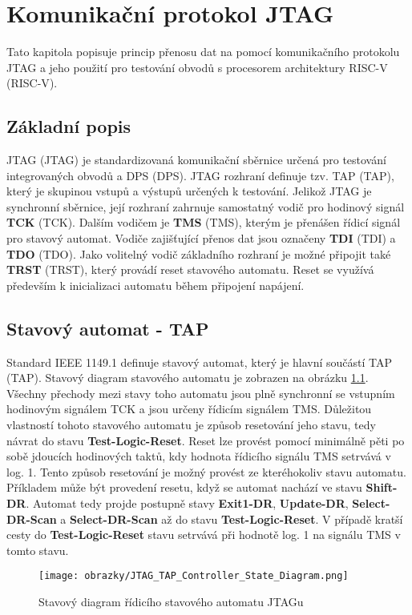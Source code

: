 \chapter{Komunikační protokol JTAG}
Tato kapitola popisuje princip přenosu dat na pomocí komunikačního protokolu JTAG a jeho použití pro testování obvodů s procesorem architektury \acs{RISC-V} (\acl{RISC-V}).

\section{Základní popis}
\acs{JTAG} (\acl{JTAG}) je standardizovaná komunikační sběrnice určená pro testování integrovaných obvodů a \acs{DPS} (\acl{DPS}).
\acs{JTAG} rozhraní definuje tzv. \acs{TAP} (\acl{TAP}), který je skupinou vstupů a výstupů určených k testování. Jelikož \acs{JTAG} je synchronní sběrnice, její rozhraní zahrnuje samostatný vodič pro hodinový signál \textbf{\acs{TCK}} (\acl{TCK}). Dalším vodičem je \textbf{\acs{TMS}} (\acl{TMS}), kterým je přenášen řídicí signál pro stavový automat. Vodiče zajišťující přenos dat jsou označeny \textbf{\acs{TDI}} (\acl{TDI}) a \textbf{\acs{TDO}} (\acl{TDO}). Jako volitelný vodič základního rozhraní je možné připojit také \textbf{\acs{TRST}} (\acl{TRST}), který provádí reset stavového automatu. Reset se využívá především k inicializaci automatu během připojení napájení. \cite {IEEE_1149-1} \cite{JTAG}      

\section{Stavový automat - \acs{TAP}}
Standard IEEE 1149.1 definuje stavový automat, který je hlavní součástí \acs{TAP} (\acl{TAP}). Stavový diagram stavového automatu je zobrazen na obrázku \ref{fig:tap_controller}. Všechny přechody mezi stavy toho automatu jsou plně synchronní se vstupním hodinovým signálem \acs{TCK} a jsou určeny řídicím signálem \acs{TMS}. Důležitou vlastností tohoto stavového automatu je způsob resetování jeho stavu, tedy návrat do stavu \textbf{Test-Logic-Reset}. Reset lze provést pomocí minimálně pěti po sobě jdoucích hodinových taktů, kdy hodnota řídicího signálu \acs{TMS} setrvává v log. 1. Tento způsob resetování je možný provést ze kteréhokoliv stavu automatu. Příkladem může být provedení resetu, když se automat nachází ve stavu \textbf{Shift-DR}. Automat tedy projde postupně stavy \textbf{Exit1-DR}, \textbf{Update-DR}, \textbf{Select-DR-Scan} a \textbf{Select-DR-Scan} až do stavu \textbf{Test-Logic-Reset}. V případě kratší cesty do \textbf{Test-Logic-Reset} stavu setrvává při hodnotě log. 1 na signálu \acs{TMS} v tomto stavu.
\begin{figure}[H]
  \begin{center}
    \texttt{[image: obrazky/JTAG\_TAP\_Controller\_State\_Diagram.png]}
  \end{center}
  \caption{Stavový diagram řídicího stavového automatu JTAGu \cite{JTAG_TAP_diagram}}
	\label{fig:tap_controller}
\end{figure}

